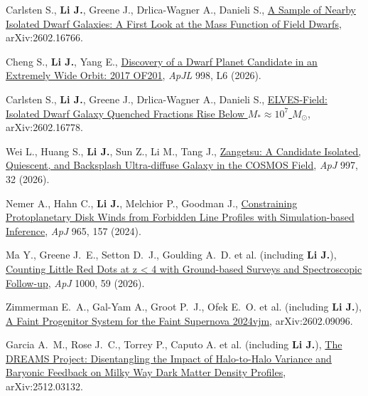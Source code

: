 
\item Carlsten S., \textbf{Li J.}, Greene J., Drlica-Wagner A., Danieli S., \href{https://ui.adsabs.harvard.edu/abs/2026arXiv260216766C}{A Sample of Nearby Isolated Dwarf Galaxies: A First Look at the Mass Function of Field Dwarfs}, arXiv:2602.16766.

\item Cheng S., \textbf{Li J.}, Yang E., \href{https://ui.adsabs.harvard.edu/abs/2026ApJ...998L...6C}{Discovery of a Dwarf Planet Candidate in an Extremely Wide Orbit: 2017 OF201}, \textit{ApJL} 998, L6 (2026).

\item Carlsten S., \textbf{Li J.}, Greene J., Drlica-Wagner A., Danieli S., \href{https://ui.adsabs.harvard.edu/abs/2026arXiv260216778C}{ELVES-Field: Isolated Dwarf Galaxy Quenched Fractions Rise Below $M_* \approx 10^7$ $M_\odot$}, arXiv:2602.16778.

\item Wei L., Huang S., \textbf{Li J.}, Sun Z., Li M., Tang J., \href{https://ui.adsabs.harvard.edu/abs/2026ApJ...997...32W}{Zangetsu: A Candidate Isolated, Quiescent, and Backsplash Ultra-diffuse Galaxy in the COSMOS Field}, \textit{ApJ} 997, 32 (2026).

\item Nemer A., Hahn C., \textbf{Li J.}, Melchior P., Goodman J., \href{https://ui.adsabs.harvard.edu/abs/2024ApJ...965..157N}{Constraining Protoplanetary Disk Winds from Forbidden Line Profiles with Simulation-based Inference}, \textit{ApJ} 965, 157 (2024).


\item Ma Y., Greene J.~E., Setton D.~J., Goulding A.~D. et al. (including \textbf{Li J.}), \href{https://ui.adsabs.harvard.edu/abs/2026ApJ..1000...59M}{Counting Little Red Dots at z < 4 with Ground-based Surveys and Spectroscopic Follow-up}, \textit{ApJ} 1000, 59 (2026).

\item Zimmerman E.~A., Gal-Yam A., Groot P.~J., Ofek E.~O. et al. (including \textbf{Li J.}), \href{https://ui.adsabs.harvard.edu/abs/2026arXiv260209096Z}{A Faint Progenitor System for the Faint Supernova 2024vjm}, arXiv:2602.09096.

\item Garcia A.~M., Rose J.~C., Torrey P., Caputo A. et al. (including \textbf{Li J.}), \href{https://ui.adsabs.harvard.edu/abs/2025arXiv251203132G}{The DREAMS Project: Disentangling the Impact of Halo-to-Halo Variance and Baryonic Feedback on Milky Way Dark Matter Density Profiles}, arXiv:2512.03132.


